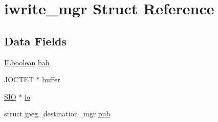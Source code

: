 \hypertarget{structiwrite__mgr}{\section{iwrite\-\_\-mgr Struct Reference}
\label{structiwrite__mgr}
}
\subsection*{Data Fields}
\begin{DoxyCompactItemize}
\item 
\hyperlink{il_8h_a8be80d75c2c636b9f2250fe10c2e7874}{I\-Lboolean} \hyperlink{structiwrite__mgr_a7b1db4582e3bb7250a80c42bf0afcf4f}{bah}
\item 
J\-O\-C\-T\-E\-T $\ast$ \hyperlink{structiwrite__mgr_ab52519326423db6890165ce4f4d3d818}{buffer}
\item 
\hyperlink{struct_s_i_o}{S\-I\-O} $\ast$ \hyperlink{structiwrite__mgr_ab6115e5993ca62edfb3a32ef981294c5}{io}
\item 
struct jpeg\-\_\-destination\-\_\-mgr \hyperlink{structiwrite__mgr_a755405c3ce0d3ee7efdd305bf2b5995d}{pub}
\end{DoxyCompactItemize}


